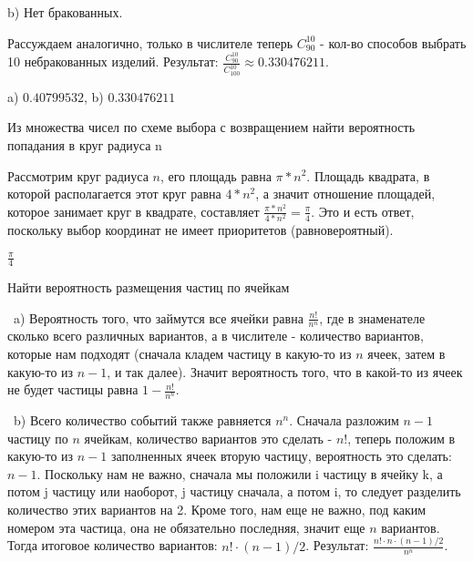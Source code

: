 \begin{subtask}{b)}
Нет бракованных.
\end{subtask}

\begin{solution}
Рассуждаем аналогично, только в числителе теперь $C_{90}^{10}$ - кол-во способов выбрать
10 небракованных изделий. Результат: $\frac{C_{90}^{10}}{C_{100}^{10}} \approx 0.330476211$.
\end{solution}


\medskip
\begin{result}
a) $0.40799532$, b) $0.330476211$
\end{result}


\medskip
\begin{task}{11}
Из множества чисел по схеме выбора с возвращением найти вероятность попадания в
круг радиуса n
\end{task}

\begin{solution}
\noindent Рассмотрим круг радиуса $n$, его площадь равна $\pi * n^2$. Площадь квадрата, в которой 
располагается этот круг равна $4 * n^2$, а значит отношение площадей, которое занимает круг в 
квадрате, составляет $\frac{\pi * n^2}{4 * n^2} = \frac{\pi}{4}$. Это и есть ответ, поскольку
выбор координат не имеет приоритетов (равновероятный).
\end{solution}

\begin{result}
$\frac{\pi}{4}$
\end{result}


\medskip
\begin{task}{13}
Найти вероятность размещения частиц по ячейкам
\end{task}

\begin{solution}
\par\noindent~a) Вероятность того, что займутся все ячейки равна $\frac{n!}{n^n}$, где в знаменателе 
сколько всего различных вариантов, а в числителе - количество вариантов, которые нам подходят (сначала
кладем частицу в какую-то из $n$ ячеек, затем в какую-то из $n - 1$, и так далее). Значит вероятность
того, что в какой-то из ячеек не будет частицы равна $1 - \frac{n!}{n^n}$.

\medskip
\noindent~b) Всего количество событий также равняется $n^n$. Сначала разложим $n - 1$ частицу 
по $n$ ячейкам, количество вариантов это сделать - $n!$, теперь положим в какую-то из $n - 1$ 
заполненных ячеек вторую частицу, вероятность это сделать: $n - 1$. Поскольку нам не важно, сначала
мы положили i частицу в ячейку k, а потом j частицу или наоборот, j частицу сначала, а потом i, 
то следует разделить количество этих вариантов на 2. Кроме того, нам 
еще не важно, под каким номером эта частица, она не обязательно последняя, 
значит еще $n$ вариантов. Тогда итоговое количество вариантов:
$n! \cdot (n - 1) / 2$. Результат: $\frac{n! \cdot n \cdot (n - 1) / 2}{n^n}$.
\end{solution}

